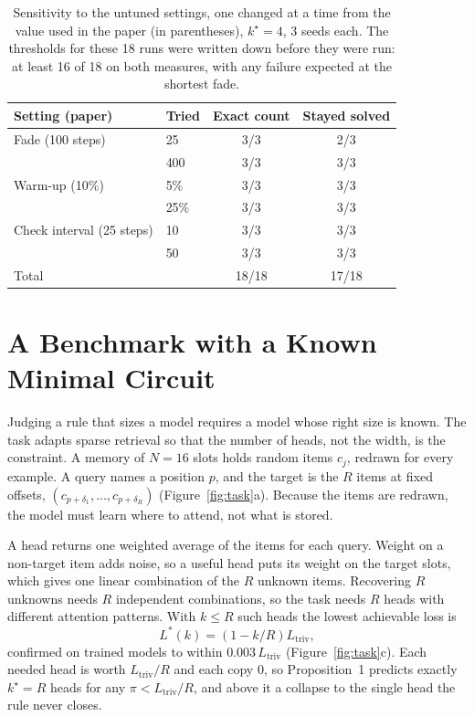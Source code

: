 \documentclass[letterpaper]{article} %
\newcommand{\Ltriv}{L_{\mathrm{triv}}}
\newcommand{\kstar}{k^\star}
\begin{document}
\begin{table}[t]
\centering
\footnotesize
\setlength{\tabcolsep}{4pt}
\begin{tabular}{@{}llcc@{}}
\toprule
Setting (paper) & Tried & Exact count & Stayed solved \\
\midrule
Fade (100 steps) & 25 & 3/3 & 2/3 \\
 & 400 & 3/3 & 3/3 \\
Warm-up (10\%) & 5\% & 3/3 & 3/3 \\
 & 25\% & 3/3 & 3/3 \\
Check interval (25 steps) & 10 & 3/3 & 3/3 \\
 & 50 & 3/3 & 3/3 \\
\midrule
Total & & 18/18 & 17/18 \\
\bottomrule
\end{tabular}
\caption{Sensitivity to the untuned settings, one changed at a time from the value used in the paper (in parentheses), $\kstar=4$, 3 seeds each. The thresholds for these 18 runs were written down before they were run: at least 16 of 18 on both measures, with any failure expected at the shortest fade.}
\label{tab:sens}
\end{table}

\section{A Benchmark with a Known Minimal Circuit}

Judging a rule that sizes a model requires a model whose right size is known. The task adapts sparse retrieval \citep{sanford2023representational} so that the number of heads, not the width, is the constraint. A memory of $N=16$ slots holds random items $c_j$, redrawn for every example. A query names a position $p$, and the target is the $R$ items at fixed offsets, $(c_{p+\delta_1},\dots,c_{p+\delta_R})$ (Figure~\ref{fig:task}a). Because the items are redrawn, the model must learn where to attend, not what is stored.

A head returns one weighted average of the items for each query. Weight on a non-target item adds noise, so a useful head puts its weight on the target slots, which gives one linear combination of the $R$ unknown items. Recovering $R$ unknowns needs $R$ independent combinations, so the task needs $R$ heads with different attention patterns. With $k\le R$ such heads the lowest achievable loss is
\begin{equation}
L^\ast(k)=\left(1-k/R\right)\Ltriv ,
\label{eq:law}
\end{equation}
confirmed on trained models to within $0.003\,\Ltriv$ (Figure~\ref{fig:task}c). Each needed head is worth $\Ltriv/R$ and each copy $0$, so Proposition~1 predicts exactly $\kstar=R$ heads for any $\pi<\Ltriv/R$, and above it a collapse to the single head the rule never closes.
\end{document}
